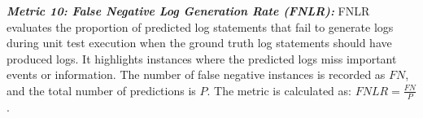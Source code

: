  \textit{\textbf{Metric 10: False Negative Log Generation Rate (FNLR):}}
FNLR evaluates the proportion of predicted log statements that fail to generate logs during unit test execution when the ground truth log statements should have produced logs. It highlights instances where the predicted logs miss important events or information. The number of false negative instances is recorded as \(FN\), and the total number of predictions is \(P\). The metric is calculated as: \(FNLR = \frac{FN}{P}\).

